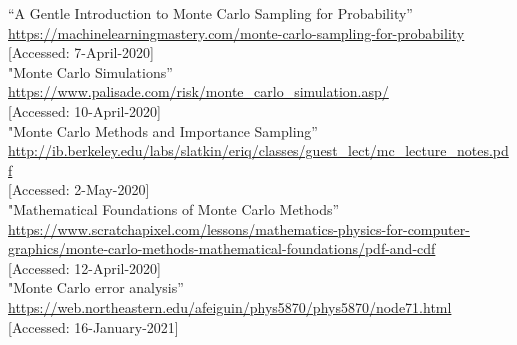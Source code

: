 \documentclass{resonance}
\begin{document}
	\pagebreak
	\begin{thebibliography}{99}
		
		\vspace{5pt}
		“A Gentle Introduction to Monte Carlo Sampling for Probability”\\ \textcolor{blue}{\url{https://machinelearningmastery.com/monte-carlo-sampling-for-probability}}\\
		{[Accessed: 7-April-2020]}\\
		
		"Monte Carlo Simulations”\\ \textcolor{blue}{\url{https://www.palisade.com/risk/monte_carlo_simulation.asp/}}\\
		{[Accessed: 10-April-2020]}\\
		
		"Monte Carlo Methods and Importance Sampling”\\ \textcolor{blue}{\url{http://ib.berkeley.edu/labs/slatkin/eriq/classes/guest\_lect/mc\_lecture\_notes.pdf}}\\
		{[Accessed: 2-May-2020]}\\
		
		"Mathematical Foundations of Monte Carlo Methods”\\ \textcolor{blue}{\url{https://www.scratchapixel.com/lessons/mathematics-physics-for-computer-graphics/monte-carlo-methods-mathematical-foundations/pdf-and-cdf}}\\
		{[Accessed: 12-April-2020]}\\
		
		"Monte Carlo error analysis”\\ \textcolor{blue}{\url{https://web.northeastern.edu/afeiguin/phys5870/phys5870/node71.html}}\\
		{[Accessed: 16-January-2021]}\\
		
	\end{thebibliography}
	
\end{document}
